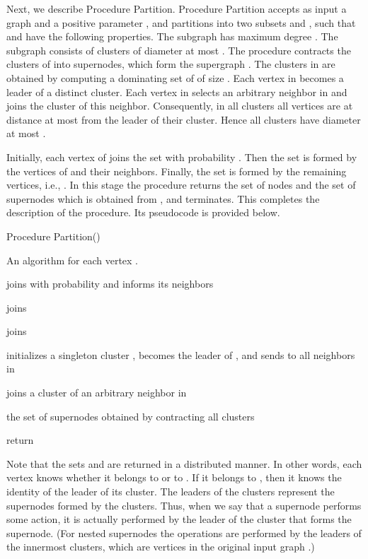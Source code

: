\documentclass[11pt]{article}
\begin{document}
Next, we describe Procedure Partition. Procedure Partition accepts as input a graph  and a positive parameter , and partitions  into two subsets  and , such that  and  have the following properties. The subgraph  has maximum degree . The subgraph  consists of  clusters of diameter at most .
The procedure contracts the clusters of  into supernodes, which form the supergraph .  The clusters in  are obtained by computing a dominating set  of  of size . Each vertex in  becomes a leader of a distinct cluster. Each vertex in  selects an arbitrary neighbor in  and joins the cluster of this neighbor. Consequently, in all clusters all vertices are at distance at most  from the leader of their cluster. Hence all clusters have diameter at most . 

Initially, each vertex of  joins the set  with probability . Then the set  is formed by the vertices of  and their neighbors. Finally, the set  is formed by the remaining vertices, i.e., . In this stage the procedure returns the set of nodes  and the set of supernodes  which is obtained from , and terminates. This completes the description of the procedure. Its pseudocode is provided below.
\begin{algorithm}[H]
\caption{Procedure Partition()}
\label{proced:partitin}
An algorithm for each vertex .
\begin{algorithmic}[1] 

\STATE  joins  with probability  and informs its neighbors


     \STATE  joins 
     
\ELSE
   
      \STATE  joins 
      
\ENDIF

\IF { }

      \STATE  initializes a singleton cluster , becomes the leader of , and sends  to all neighbors in 

\ENDIF


      \STATE  joins a cluster of an arbitrary neighbor in 
      
\ENDIF

\STATE  the set of supernodes obtained by contracting all clusters 

\STATE return 

\end{algorithmic}
\end{algorithm}
Note that the sets  and  are returned in a distributed manner. In other words, each vertex knows whether it belongs to  or to . If it belongs to , then it knows the identity of the leader of its cluster. The leaders of the clusters represent the supernodes formed by the clusters. Thus, when we say that a supernode performs some action, it is actually performed by the leader of the cluster that forms the supernode. (For nested supernodes the operations are performed by the leaders of the innermost clusters, which are vertices in the original input graph .)
\end{document}
